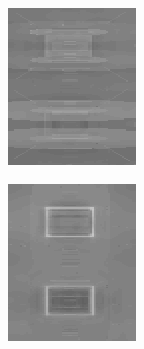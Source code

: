 \documentclass[journal,onecolumn]{IEEEtran}
\begin{document}
{\begin{figure}[H]
\begin{subfigure}[b]{0.2\textwidth}
            \caption{}
            \label{fig:test-crisp-opp-1-rg}
    \end{subfigure}%
    \begin{subfigure}[b]{0.2\textwidth}
            \centering
            \includegraphics[width=.85\linewidth, frame]{test-crisp-opp-2-rg}
            \caption{}
            \label{fig:test-crisp-opp-2-rg}
    \end{subfigure}%
    \begin{subfigure}[b]{0.2\textwidth}
            \centering
            \includegraphics[width=.85\linewidth, frame]{test-crisp-opp-3-rg}

\end{subfigure}
\end{figure}}
\end{document}
